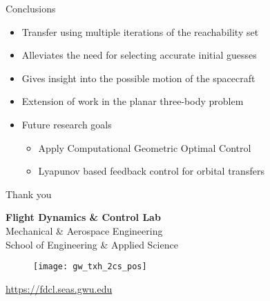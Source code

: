 \begin{frame}{Conclusions} %
\begin{itemize}
    \item Transfer using multiple iterations of the reachability set
    \item Alleviates the need for selecting accurate initial guesses 
    \item Gives insight into the possible motion of the spacecraft
    \item Extension of work in the planar three-body problem
    \item Future research goals
        \begin{itemize}
            \item Apply Computational Geometric Optimal Control
            \item Lyapunov based feedback control for orbital transfers
        \end{itemize}
\end{itemize}

\end{frame}   %

\begin{frame}[c]{Thank you}
  \centering
  
  \textbf{\large Flight Dynamics \& Control Lab} \\
  Mechanical \& Aerospace Engineering \\
  School of Engineering \& Applied Science
  
  \begin{figure} %
        \texttt{[image: gw\_txh\_2cs\_pos]}
    \end{figure}
  
  \url{https://fdcl.seas.gwu.edu}
\end{frame}